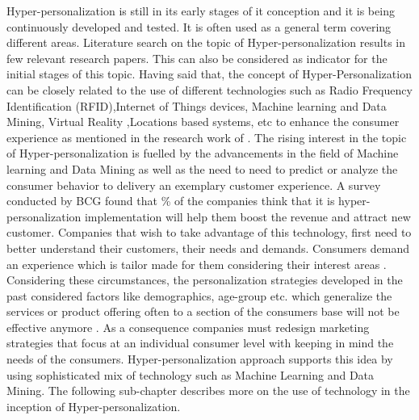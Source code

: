 Hyper-personalization is still in its early stages of it conception and it is being continuously developed and tested. It is often used as a general term covering different areas. Literature search on the topic of Hyper-personalization results in few relevant research papers. This can also be considered as indicator for the initial stages of this topic. Having said that, the concept of Hyper-Personalization can be closely related to the use of different technologies such as Radio Frequency Identification (RFID),Internet of Things devices, Machine learning and Data Mining, Virtual Reality ,Locations based systems, etc to enhance the consumer experience as mentioned in the research work of \textcite[2]{Faulds2018}.  The rising interest in the topic of Hyper-personalization is fuelled by the advancements in the field of Machine learning and Data Mining as well as the need to need to predict or analyze the consumer behavior to delivery an exemplary customer experience\autocite[]{CapgeminiconsultingESSECBusinessSchool2016}. A survey conducted by BCG found that \% of the companies think that it is hyper-personalization implementation will help them boost the revenue and attract new customer. Companies that wish to take advantage of this technology, first need to better understand their customers, their needs and demands. Consumers demand an experience which is tailor made for them considering their interest areas \autocite[6]{CapgeminiconsultingESSECBusinessSchool2016}. Considering these circumstances, the personalization strategies developed in the past considered factors like demographics, age-group etc. which generalize the services or product offering often to a section of the consumers base will not be effective anymore \autocite[6]{CapgeminiconsultingESSECBusinessSchool2016}. As a consequence companies must redesign marketing strategies that focus at an individual consumer level with keeping in mind the needs of the consumers. Hyper-personalization approach supports this idea by using sophisticated mix of technology such as Machine Learning and Data Mining. The following sub-chapter describes more on the use of technology in the inception of Hyper-personalization.


